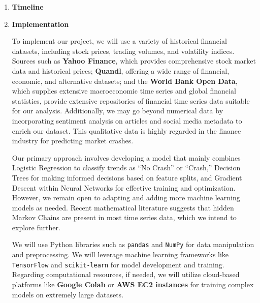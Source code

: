 \documentclass[12pt, letterpaper]{article}
\begin{document}
\begin{enumerate}[label=]
    \item \textbf{Timeline}
        
        
    \item \textbf{Implementation} %

    


    To implement our project, we will use a variety of historical financial datasets, including stock prices, trading volumes, and volatility indices. Sources such as \textbf{Yahoo Finance}, which provides comprehensive stock market data and historical prices; \textbf{Quandl}, offering a wide range of financial, economic, and alternative datasets; and the \textbf{World Bank Open Data}, which supplies extensive macroeconomic time series and global financial statistics, provide extensive repositories of financial time series data suitable for our analysis. Additionally, we may go beyond numerical data by incorporating sentiment analysis on articles and social media metadata to enrich our dataset. This qualitative data is highly regarded in the finance industry for predicting market crashes.

Our primary approach involves developing a model that mainly combines Logistic Regression to classify trends as ``No Crash'' or ``Crash,'' Decision Trees for making informed decisions based on feature splits, and Gradient Descent within Neural Networks for effective training and optimization. However, we remain open to adapting and adding more machine learning models as needed. Recent mathematical literature suggests that hidden Markov Chains are present in most time series data, which we intend to explore further.

We will use Python libraries such as \texttt{pandas} and \texttt{NumPy} for data manipulation and preprocessing. We will leverage machine learning frameworks like \texttt{TensorFlow} and \texttt{scikit-learn} for model development and training. Regarding computational resources, if needed, we will utilize cloud-based platforms like \textbf{Google Colab} or \textbf{AWS EC2 instances} for training complex models on extremely large datasets. 



    





    
\end{enumerate}
\end{document}
